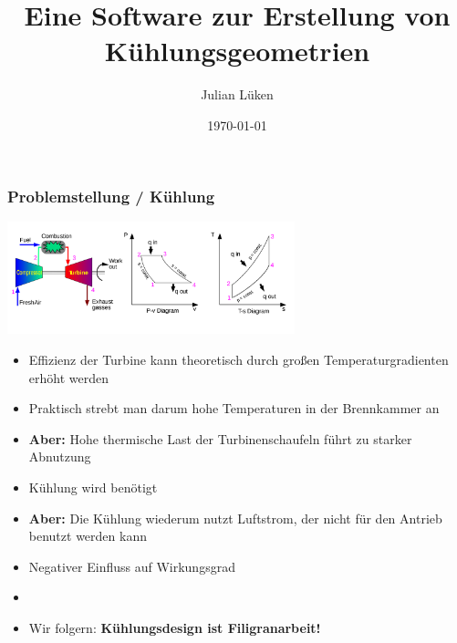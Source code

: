 \documentclass[8pt, aspectratio=169]{beamer}
\title[CoolingGen]{Eine Software zur Erstellung von Kühlungsgeometrien}
\author{Julian Lüken}
\date{\today}
\begin{document}
\begin{frame}[plain]
	\maketitle
\end{frame}

\begin{frame}
	\frametitle{Problemstellung / Kühlung}
	\vspace{-1cm}\hspace{-0.5cm}
	\centering
	\begin{minipage}[t]{0.8\textwidth}
		\centering
		\hspace{0.36\textwidth}
		\includegraphics[width=0.625\textwidth]{images/Brayton_cycle.svg.png}
	\end{minipage}
	\begin{minipage}[t]{\textwidth}
		\begin{itemize}
			\item Effizienz der Turbine kann theoretisch durch großen Temperaturgradienten erhöht werden
			\item[] 	\textrightarrow{} Praktisch strebt man darum hohe Temperaturen in der Brennkammer an
			\item 		\textbf{Aber:} Hohe thermische Last der Turbinenschaufeln führt zu starker Abnutzung
			\item[] 	\textrightarrow{} Kühlung wird benötigt
			\item 		\textbf{Aber:} Die Kühlung wiederum nutzt Luftstrom, der nicht für den Antrieb benutzt werden kann
			\item[] 	\textrightarrow{} Negativer Einfluss auf Wirkungsgrad
			\item[] 	{}
			\item[\textrightarrow] Wir folgern: \textbf{Kühlungsdesign ist Filigranarbeit!}
		\end{itemize}
	\end{minipage}
	\vfill
\end{frame}
\end{document}
